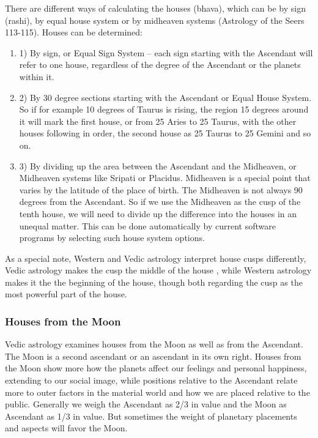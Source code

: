 There are different ways of calculating the houses (bhava), which can be by sign (rashi), by equal house system or by midheaven systems (Astrology of the Seers 113-115). Houses can be determined:

 

\begin{enumerate}
\item[] 1) By sign, or Equal Sign System – each sign starting with the Ascendant will refer to one house, regardless of the degree of the Ascendant or the planets within it.

\item[] 2) By 30 degree sections starting with the Ascendant or Equal House System. So if for example 10 degrees of Taurus is rising, the region 15 degrees around it will mark the first house, or from 25 Aries to 25 Taurus, with the other houses following in order, the second house as 25 Taurus to 25 Gemini and so on.

\item[] 3) By dividing up the area between the Ascendant and the Midheaven, or Midheaven systems like Sripati or Placidus. Midheaven is a special point that varies by the latitude of the place of birth. The Midheaven is not always 90 degrees from the Ascendant. So if we use the Midheaven as the cusp of the tenth house, we will need to divide up the difference into the houses in an unequal matter. This can be done automatically by current software programs by selecting such house system options.
\end{enumerate}
 

As a special note, Western and Vedic astrology interpret house cusps differently, Vedic astrology makes the cusp the middle of the house , while Western astrology makes it the the beginning of the house, though both regarding the cusp as the most powerful part of the house.

 

\subsubsection{Houses from the Moon}

 

Vedic astrology examines houses from the Moon as well as from the Ascendant. The Moon is a second ascendant or an ascendant in its own right. Houses from the Moon show more how the planets affect our feelings and personal happiness, extending to our social image, while positions relative to the Ascendant relate more to outer factors in the material world and how we are placed relative to the public. Generally we weigh the Ascendant as 2/3 in value and the Moon as Ascendant as 1/3 in value. But sometimes the weight of planetary placements and aspects will favor the Moon.

